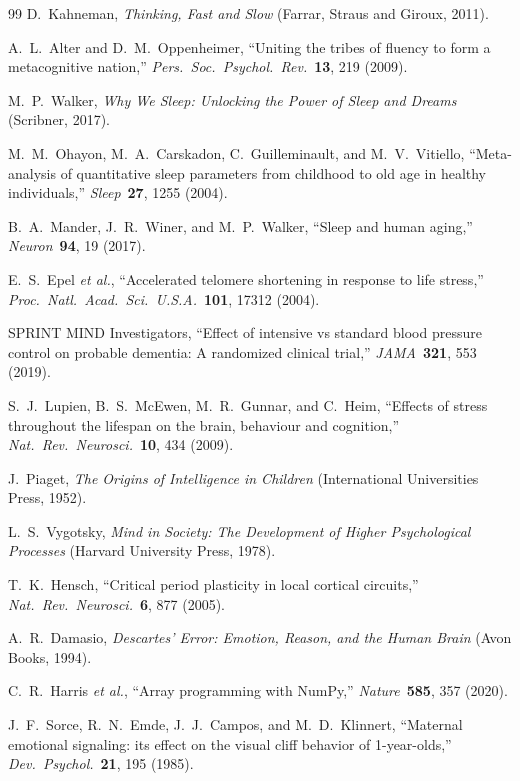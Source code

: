 ﻿\documentclass[aps,pre,twocolumn,superscriptaddress,floatfix]{revtex4-2}
\begin{document}
\begin{thebibliography}{99}
D.~Kahneman,
\emph{Thinking, Fast and Slow}
(Farrar, Straus and Giroux, 2011).

A.~L.~Alter and D.~M.~Oppenheimer,
``Uniting the tribes of fluency to form a metacognitive nation,''
\emph{Pers.\ Soc.\ Psychol.\ Rev.}\ \textbf{13}, 219 (2009).

M.~P.~Walker,
\emph{Why We Sleep: Unlocking the Power of Sleep and Dreams}
(Scribner, 2017).

M.~M.~Ohayon, M.~A.~Carskadon, C.~Guilleminault,
and M.~V.~Vitiello,
``Meta-analysis of quantitative sleep parameters from
childhood to old age in healthy individuals,''
\emph{Sleep}\ \textbf{27}, 1255 (2004).

B.~A.~Mander, J.~R.~Winer, and M.~P.~Walker,
``Sleep and human aging,''
\emph{Neuron}\ \textbf{94}, 19 (2017).

E.~S.~Epel \emph{et al.},
``Accelerated telomere shortening in response to life stress,''
\emph{Proc.\ Natl.\ Acad.\ Sci.\ U.S.A.}\ \textbf{101},
17312 (2004).

SPRINT MIND Investigators,
``Effect of intensive vs standard blood pressure control on
probable dementia: A randomized clinical trial,''
\emph{JAMA}\ \textbf{321}, 553 (2019).

S.~J.~Lupien, B.~S.~McEwen, M.~R.~Gunnar, and C.~Heim,
``Effects of stress throughout the lifespan on the brain,
behaviour and cognition,''
\emph{Nat.\ Rev.\ Neurosci.}\ \textbf{10}, 434 (2009).

J.~Piaget,
\emph{The Origins of Intelligence in Children}
(International Universities Press, 1952).

L.~S.~Vygotsky,
\emph{Mind in Society: The Development of Higher
Psychological Processes}
(Harvard University Press, 1978).

T.~K.~Hensch,
``Critical period plasticity in local cortical circuits,''
\emph{Nat.\ Rev.\ Neurosci.}\ \textbf{6}, 877 (2005).

A.~R.~Damasio,
\emph{Descartes' Error: Emotion, Reason, and the Human Brain}
(Avon Books, 1994).

C.~R.~Harris \emph{et al.},
``Array programming with NumPy,''
\emph{Nature}\ \textbf{585}, 357 (2020).

J.~F.~Sorce, R.~N.~Emde, J.~J.~Campos, and
M.~D.~Klinnert,
``Maternal emotional signaling: its effect on the
visual cliff behavior of 1-year-olds,''
\emph{Dev.\ Psychol.}\ \textbf{21}, 195 (1985).

\end{thebibliography}
\end{document}
